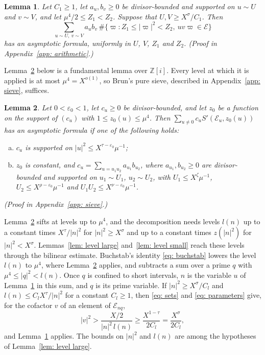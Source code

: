 \documentclass{article}
\numberwithin{equation}{section}
\newtheorem{lemma}{Lemma}
\newcommand{\Le}{\leqslant}
\newcommand{\Ge}{\geqslant}
\begin{document}
\begin{lemma}
\label{lem: type II}
Let $C_1 \Ge 1$, let $a_u, b_v \Ge 0$ be divisor-bounded and supported on $u \sim U$ and $v \sim V$, and let $\mu^4/2 \Le Z_1 < Z_2$. Suppose that $U, V \Ge X^{\sigma}/C_1$. Then
\begin{equation}
\label{eq: type II}
\sum_{u \sim U,\ v \sim V} a_u b_v\, \#\{ \varpi : Z_1 \Le |\varpi|^2 < Z_2,\ uv\varpi \in \mathcal{E} \}
\end{equation}
has an asymptotic formula, uniformly in $U$, $V$, $Z_1$ and $Z_2$.
\emph{(Proof in Appendix~\ref{app: arithmetic}.)}
\end{lemma}

Lemma~\ref{lem: fundamental} below is a fundamental lemma over $\mathbb{Z}[i]$. Every level at which it is applied is at most $\mu^4 = X^{o(1)}$, so Brun's pure sieve, described in Appendix~\ref{app: sieve}, suffices.

\begin{lemma}
\label{lem: fundamental}
Let $0 < \varepsilon_0 < 1$, let $c_u \Ge 0$ be divisor-bounded, and let $z_0$ be a function on the support of $(c_u)$ with $1 \Le z_0(u) \Le \mu^4$. Then $\sum_{u \neq 0} c_u S'(\mathcal{E}_u, z_0(u))$ has an asymptotic formula if one of the following holds:
\begin{enumerate}[(a)]
\item $c_u$ is supported on $|u|^2 \Le X^{\tau - \varepsilon_0} \mu^{-1}$;
\item $z_0$ is constant, and $c_u = \sum_{u = u_1 u_2} a_{u_1} b_{u_2}$, where $a_{u_1}, b_{u_2} \Ge 0$ are divisor-bounded and supported on $u_1 \sim U_1$, $u_2 \sim U_2$, with $U_1 \Le X^{\zeta} \mu^{-1}$, $U_2 \Le X^{\rho - \varepsilon_0} \mu^{-1}$ and $U_1U_2 \Le X^{\nu - \varepsilon_0} \mu^{-1}$.
\end{enumerate}
\emph{(Proof in Appendix~\ref{app: sieve}.)}
\end{lemma}

Lemma~\ref{lem: fundamental} sifts at levels up to $\mu^4$, and the decomposition needs levels $l(n)$ up to a constant times $X^{\tau}/|n|^2$ for $|n|^2 \Ge X^{\sigma}$ and up to a constant times $z(|n|^2)$ for $|n|^2 < X^{\sigma}$. Lemmas~\ref{lem: level large} and~\ref{lem: level small} reach these levels through the bilinear estimate. Buchstab's identity \eqref{eq: buchstab} lowers the level $l(n)$ to $\mu^4$, where Lemma~\ref{lem: fundamental} applies, and subtracts a sum over a prime $q$ with $\mu^4 \Le |q|^2 < l(n)$. Once $q$ is confined to short intervals, $n$ is the variable $u$ of Lemma~\ref{lem: type II} in this sum, and $q$ is its prime variable. If $|n|^2 \Ge X^{\sigma}/C_l$ and $l(n) \Le C_l X^{\tau}/|n|^2$ for a constant $C_l \Ge 1$, then \eqref{eq: sets} and \eqref{eq: parameters} give, for the cofactor $v$ of an element of $\mathcal{E}_{nq}$,
\begin{equation*}
|v|^2 > \frac{X/2}{|n|^2\, l(n)} \Ge \frac{X^{1 - \tau}}{2C_l} = \frac{X^{\sigma}}{2C_l},
\end{equation*}
and Lemma~\ref{lem: type II} applies. The bounds on $|n|^2$ and $l(n)$ are among the hypotheses of Lemma~\ref{lem: level large}.
\end{document}
